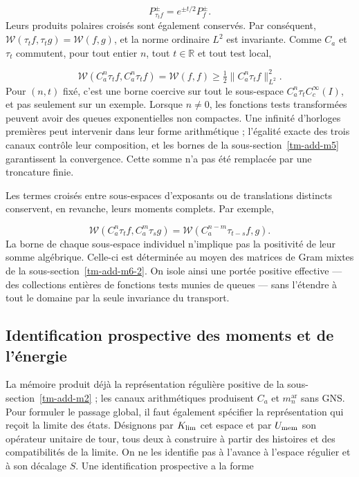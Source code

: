\[
P_{\tau_t f}^{\pm}=e^{\pm t/2}P_f^{\pm}.
\]
Leurs produits polaires croisés sont également conservés. Par conséquent, \(\mathscr W(\tau_t f,\tau_t g)=\mathscr W(f,g)\), et la norme ordinaire \(L^2\) est invariante. Comme \(C_a\) et \(\tau_t\) commutent, pour tout entier \(n\), tout \(t\in\mathbb R\) et tout test local,

\[
\boxed{\mathscr W(C_a^n\tau_t f,C_a^n\tau_t f)
=\mathscr W(f,f)
\geq\tfrac12\|C_a^n\tau_t f\|_{L^2}^2.}
\]
Pour \((n,t)\) fixé, c'est une borne coercive sur tout le sous-espace \(C_a^n\tau_t C_c^\infty(I)\), et pas seulement sur un exemple. Lorsque \(n\ne0\), les fonctions tests transformées peuvent avoir des queues exponentielles non compactes. Une infinité d'horloges premières peut intervenir dans leur forme arithmétique ; l'égalité exacte des trois canaux contrôle leur composition, et les bornes de la sous-section~\ref{tm-add-m5} garantissent la convergence. Cette somme n'a pas été remplacée par une troncature finie.

Les termes croisés entre sous-espaces d'exposants ou de translations distincts conservent, en revanche, leurs moments complets. Par exemple,

\[
\mathscr W(C_a^n\tau_t f,C_a^m\tau_s g)
=\mathscr W(C_a^{n-m}\tau_{t-s}f,g).
\]
La borne de chaque sous-espace individuel n'implique pas la positivité de leur somme algébrique. Celle-ci est déterminée au moyen des matrices de Gram mixtes de la sous-section~\ref{tm-add-m6-2}. On isole ainsi une portée positive effective — des collections entières de fonctions tests munies de queues — sans l'étendre à tout le domaine par la seule invariance du transport.


\subsection{Identification prospective des moments et de l'énergie}
\label{tm-add-m7}
La mémoire produit déjà la représentation régulière positive de la sous-section~\ref{tm-add-m2} ; les canaux arithmétiques produisent \(C_a\) et \(m_n^{\mathrm{ar}}\) sans GNS. Pour formuler le passage global, il faut également spécifier la représentation qui reçoit la limite des états. Désignons par \(\mathcal K_{\rm lim}\) cet espace et par \(U_{\rm mem}\) son opérateur unitaire de tour, tous deux à construire à partir des histoires et des compatibilités de la limite. On ne les identifie pas à l'avance à l'espace régulier et à son décalage \(S\). Une identification prospective a la forme

